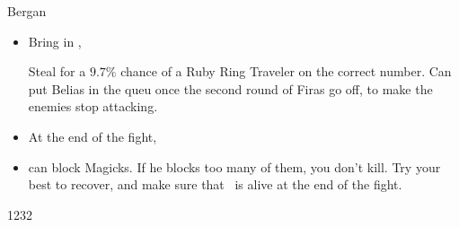 \begin{battle}{Bergan}
	\begin{itemize}
		\vaanf Run up to Bergan
		\item Bring in \ashe, \penelo
		      \begin{liscense}
		      \end{liscense}
		\vaanf Steal for a $9.7\%$ chance of a Ruby Ring
		\vaanf Traveler on the correct number.
		\vaanf Can put Belias in the queu once the second round of Firas go off, to make the enemies stop attacking.
		\item At the end of the fight, \AllGambitsOff
		\item {} can block Magicks. If he blocks too many of them, you don't kill. Try your best to recover, and make sure that \ashe\ is alive at the end of the fight.		
	\end{itemize}
\end{battle}
\begin{shop}{1232}
\end{shop}
